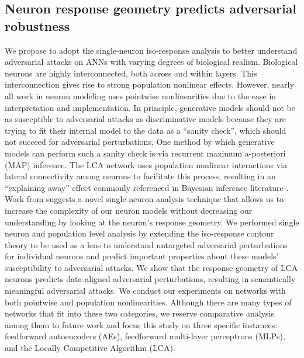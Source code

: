 \subsection{Neuron response geometry predicts adversarial robustness}\label{sec:ch4_neuron}
We propose to adopt the single-neuron iso-response analysis to better understand adversarial attacks on ANNs with varying degrees of biological realism.
Biological neurons are highly interconnected, both across and within layers.
This interconnection gives rise to strong population nonlinear effects.
However, nearly all work in neuron modeling uses pointwise nonlinearities due to the ease in interpretation and implementation.
In principle, generative models should not be as susceptible to adversarial attacks as discriminative models because they are trying to fit their internal model to the data as a ``sanity check'', which should not succeed for adversarial perturbations. One method by which generative models can perform such a sanity check is via recurrent maximum a-posteriori (MAP) inference. The LCA network uses population nonlinear interactions via lateral connectivity among neurons to facilitate this process, resulting in an ``explaining away'' effect commonly referenced in Bayesian inference literature \parencite{olshausen2013perception}.
Work from \parencite{golden2016conjectures} suggests a novel single-neuron analysis technique that allows us to increase the complexity of our neuron models without decreasing our understanding by looking at the neuron’s response geometry.
We performed single neuron and population level analysis by extending the iso-response contour theory to be used as a lens to understand untargeted adversarial perturbations for individual neurons \parencite{golden2016conjectures,vilankar2017selectivity} and predict important properties about these models' susceptibility to adversarial attacks.
We show that the response geometry of LCA neurons predicts data-aligned adversarial perturbations, resulting in semantically meaningful adversarial attacks.
We conduct our experiments on networks with both pointwise and population nonlinearities.
Although there are many types of networks that fit into these two categories, we reserve comparative analysis among them to future work and focus this study on three specific instances: feedforward autoencoders (AEs), feedforward multi-layer perceptrons (MLPs), and the Locally Competitive Algorithm (LCA).


